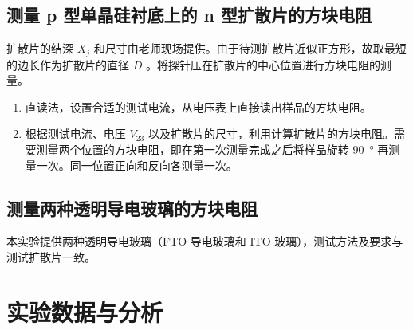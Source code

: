 \documentclass[a4paper,utf8]{article}
\begin{document}
    \subsection{测量 p 型单晶硅衬底上的 n 型扩散片的方块电阻}
        扩散片的结深 $X_j$ 和尺寸由老师现场提供。由于待测扩散片近似正方形，故取最短的边长作为扩散片的直径 $D$ 。将探针压在扩散片的中心位置进行方块电阻的测量。
        \begin{enumerate}
            \item 直读法，设置合适的测试电流，从电压表上直接读出样品的方块电阻。
            \item 根据测试电流、电压 $V_{23}$ 以及扩散片的尺寸，利用计算扩散片的方块电阻。需要测量两个位置的方块电阻，即在第一次测量完成之后将样品旋转 \SI{90}{\degree} 再测量一次。同一位置正向和反向各测量一次。
        \end{enumerate}
    \subsection{测量两种透明导电玻璃的方块电阻}
        本实验提供两种透明导电玻璃（FTO 导电玻璃和 ITO 玻璃），测试方法及要求与测试扩散片一致。
        \pagebreak
\section{实验数据与分析}
\end{document}
